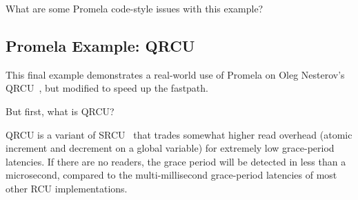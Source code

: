 \QuickQuiz{}
	What are some Promela code-style issues with this example?
 \QuickQuizEnd


\subsection{Promela Example: QRCU}
\label{sec:formal:Promela Example: QRCU}

This final example demonstrates a real-world use of Promela on Oleg
Nesterov's
QRCU~\cite{OlegNesterov2006QRCU,OlegNesterov2006aQRCU},
but modified to speed up the 
fastpath.

But first, what is QRCU?

QRCU is a variant of SRCU~\cite{PaulEMcKenney2006c}
that trades somewhat higher read overhead
(atomic increment and decrement on a global variable) for extremely
low grace-period latencies.
If there are no readers, the grace period will be detected in less
than a microsecond, compared to the multi-millisecond grace-period
latencies of most other RCU implementations.

